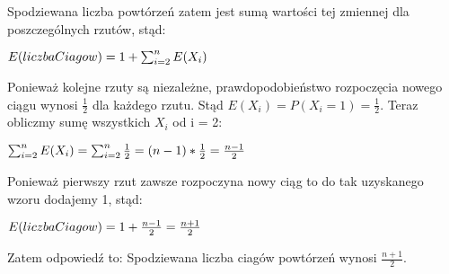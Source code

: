 \documentclass[12pt,oneside,a4paper]{book} %
\theoremstyle{break}
\begin{document}
Spodziewana liczba powtórzeń zatem jest sumą wartości tej zmiennej dla poszczególnych rzutów, stąd:

\begin{math}
  \centering
  E(liczbaCiagow) = 1 + \sum_{i=2}^{n}E(X_i)
\end{math}

Ponieważ kolejne rzuty są niezależne, prawdopodobieństwo rozpoczęcia nowego ciągu wynosi $\frac{1}{2}$ dla każdego rzutu. Stąd $E(X_i)=P(X_i=1)=\frac{1}{2}$. Teraz obliczmy sumę wszystkich $X_i$ od i = 2:

\begin{math}
  \centering
  \sum_{i=2}^{n}E(X_i) = \sum_{i=2}^{n}\frac{1}{2} = (n-1)*\frac{1}{2} = \frac{n-1}{2}
\end{math}

Ponieważ pierwszy rzut zawsze rozpoczyna nowy ciąg to do tak uzyskanego wzoru dodajemy 1, stąd:

\begin{math}
  \centering
  E(liczbaCiagow) = 1 + \frac{n-1}{2} = \frac{n+1}{2}
\end{math}

Zatem odpowiedź to: Spodziewana liczba ciagów powtórzeń wynosi $\frac{n+1}{2}$.

\begin{thebibliography}{00}

\end{thebibliography}
\end{document}
